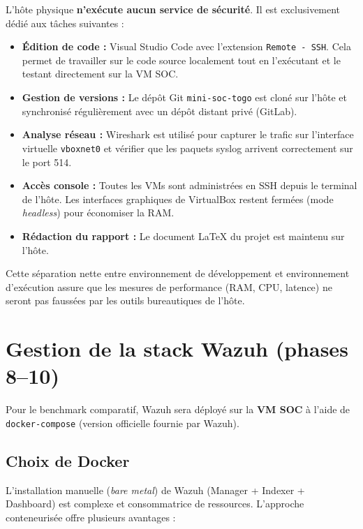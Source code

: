 \documentclass[12pt,a4paper]{article}
\begin{document}
L'hôte physique \textbf{n'exécute aucun service de sécurité}. Il est exclusivement dédié aux tâches suivantes :

\begin{itemize}
    \item \textbf{Édition de code :} Visual Studio Code avec l'extension \texttt{Remote - SSH}. Cela permet de travailler sur le code source localement tout en l'exécutant et le testant directement sur la VM SOC.
    \item \textbf{Gestion de versions :} Le dépôt Git \texttt{mini-soc-togo} est cloné sur l'hôte et synchronisé régulièrement avec un dépôt distant privé (GitLab).
    \item \textbf{Analyse réseau :} Wireshark est utilisé pour capturer le trafic sur l'interface virtuelle \texttt{vboxnet0} et vérifier que les paquets syslog arrivent correctement sur le port 514.
    \item \textbf{Accès console :} Toutes les VMs sont administrées en SSH depuis le terminal de l'hôte. Les interfaces graphiques de VirtualBox restent fermées (mode \textit{headless}) pour économiser la RAM.
    \item \textbf{Rédaction du rapport :} Le document LaTeX du projet est maintenu sur l'hôte.
\end{itemize}

Cette séparation nette entre environnement de développement et environnement d'exécution assure que les mesures de performance (RAM, CPU, latence) ne seront pas faussées par les outils bureautiques de l'hôte.



\section{Gestion de la stack Wazuh (phases 8–10)}
\label{sec:wazuh}

Pour le benchmark comparatif, Wazuh sera déployé sur la \textbf{VM SOC} à l'aide de \texttt{docker-compose} (version officielle fournie par Wazuh).

\subsection{Choix de Docker}

L'installation manuelle (\textit{bare metal}) de Wazuh (Manager + Indexer + Dashboard) est complexe et consommatrice de ressources. L'approche conteneurisée offre plusieurs avantages :
\end{document}
